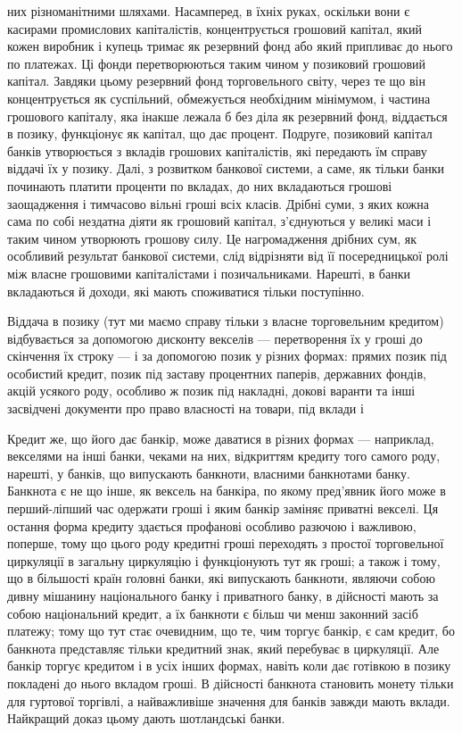 \parcont{}  %
них різноманітними шляхами. Насамперед, в їхніх руках, оскільки
вони є касирами промислових капіталістів, концентрується грошовий
капітал, який кожен виробник і купець тримає як резервний
фонд або який припливає до нього по платежах. Ці
фонди перетворюються таким чином у позиковий грошовий
капітал. Завдяки цьому резервний фонд торговельного світу,
через те що він концентрується як суспільний, обмежується
необхідним мінімумом, і частина грошового капіталу, яка інакше
лежала б без діла як резервний фонд, віддається в позику,
функціонує як капітал, що дає процент. Подруге, позиковий
капітал банків утворюється з вкладів грошових капіталістів, які
передають їм справу віддачі їх у позику. Далі, з розвитком банкової
системи, а саме, як тільки банки починають платити проценти
по вкладах, до них вкладаються грошові заощадження
і тимчасово вільні гроші всіх класів. Дрібні суми, з яких кожна
сама по собі нездатна діяти як грошовий капітал, з’єднуються
у великі маси і таким чином утворюють грошову силу. Це нагромадження
дрібних сум, як особливий результат банкової системи,
слід відрізняти від її посередницької ролі між власне грошовими
капіталістами і позичальниками. Нарешті, в банки вкладаються
й доходи, які мають споживатися тільки поступінно.

Віддача в позику (тут ми маємо справу тільки з власне торговельним
кредитом) відбувається за допомогою дисконту векселів
— перетворення їх у гроші до скінчення їх строку — і за
допомогою позик у різних формах: прямих позик під особистий
кредит, позик під заставу процентних паперів, державних фондів,
акцій усякого роду, особливо ж позик під накладні, докові
варанти та інші засвідчені документи про право власності на
товари, під вклади і~

Кредит же, що його дає банкір, може даватися в різних формах
— наприклад, векселями на інші банки, чеками на них, відкриттям
кредиту того самого роду, нарешті, у банків, що випускають
банкноти, власними банкнотами банку. Банкнота є не
що інше, як вексель на банкіра, по якому пред’явник його може
в перший-ліпший час одержати гроші і яким банкір заміняє приватні
векселі. Ця остання форма кредиту здається профанові
особливо разючою і важливою, поперше, тому що цього роду
кредитні гроші переходять з простої торговельної циркуляції
в загальну циркуляцію і функціонують тут як гроші; а також
і тому, що в більшості країн головні банки, які випускають
банкноти, являючи собою дивну мішанину національного банку
і приватного банку, в дійсності мають за собою національний
кредит, а їх банкноти є більш чи менш законний засіб платежу;
тому що тут стає очевидним, що те, чим торгує банкір, є сам
кредит, бо банкнота представляє тільки кредитний знак, який перебуває
в циркуляції. Але банкір торгує кредитом і в усіх інших формах,
навіть коли дає готівкою в позику покладені до нього вкладом
гроші. В дійсності банкнота становить монету тільки для гуртової
торгівлі, а найважливіше значення для банків завжди мають вклади. Найкращий доказ цьому дають
шотландські банки.

